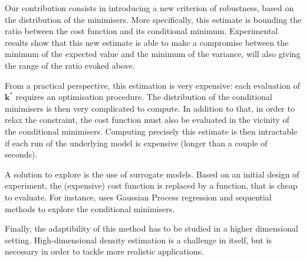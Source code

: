 \documentclass[npg, manuscript]{copernicus}
\begin{document}
Our contribution consists in introducing a new criterion of robustness, based on the distribution of the minimisers. More specifically, this estimate is bounding the ratio between the cost function and its conditional minimum.
Experimental results show that this new estimate is able to make a compromise between the minimum of the expected value and the minimum of the variance, will also giving the range of the ratio evoked above.

From a practical perspective, this estimation is very expensive: each evaluation of $\mathbf{k}^*$ requires an optimisation procedure. The distribution of the conditional minimisers is then very complicated to compute.
In addition to that, in order to relax the constraint, the cost function must also be evaluated in the vicinity of the conditional minimisers. Computing precisely this estimate is then intractable if each run of the underlying model is expensive (longer than a couple of seconds).


A solution to explore is the use of surrogate models. Based on an initial design of experiment, the (expensive) cost function is replaced by a function, that is cheap to evaluate.
For instance, \cite{ginsbourger_bayesian_2014}
uses Gaussian Process regression and sequential methods to explore the conditional minimisers.

Finally, the adaptibility of this method has to be studied in a higher dimensional setting. High-dimensional density estimation is a challenge in itself, but is necessary in order to tackle more realistic applications.










\end{document}
